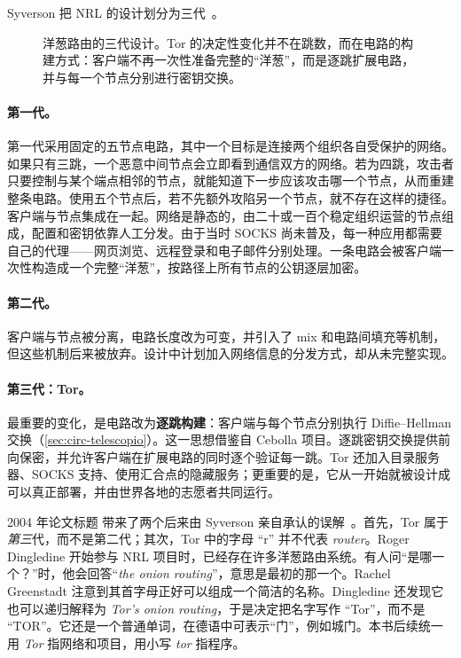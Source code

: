 Syverson 把 NRL 的设计划分为三代~\cite{syverson2011peel}。

\begin{figure}[htbp]
\centering

\caption{洋葱路由的三代设计。Tor 的决定性变化并不在跳数，而在电路的构建方式：客户端不再一次性准备完整的“洋葱”，而是逐跳扩展电路，并与每一个节点分别进行密钥交换。}
\label{fig:generazioni}
\end{figure}

\paragraph{第一代。} 第一代采用固定的五节点电路，其中一个目标是连接两个组织各自受保护的网络。如果只有三跳，一个恶意中间节点会立即看到通信双方的网络。若为四跳，攻击者只要控制与某个端点相邻的节点，就能知道下一步应该攻击哪一个节点，从而重建整条电路。使用五个节点后，若不先额外攻陷另一个节点，就不存在这样的捷径。客户端与节点集成在一起。网络是静态的，由二十或一百个稳定组织运营的节点组成，配置和密钥依靠人工分发。由于当时 SOCKS 尚未普及，每一种应用都需要自己的代理——网页浏览、远程登录和电子邮件分别处理。一条电路会被客户端一次性构造成一个完整“洋葱”，按路径上所有节点的公钥逐层加密。

\paragraph{第二代。} 客户端与节点被分离，电路长度改为可变，并引入了 mix 和电路间填充等机制，但这些机制后来被放弃。设计中计划加入网络信息的分发方式，却从未完整实现。

\paragraph{第三代：Tor。} 最重要的变化，是电路改为\textbf{逐跳构建}：客户端与每个节点分别执行 Diffie--Hellman 交换（\cref{sec:circ-telescopio}）。这一思想借鉴自 Cebolla 项目。逐跳密钥交换提供前向保密，并允许客户端在扩展电路的同时逐个验证每一跳。Tor 还加入目录服务器、SOCKS 支持、使用汇合点的隐藏服务；更重要的是，它从一开始就被设计成可以真正部署，并由世界各地的志愿者共同运行。

\begin{storia}[名称的由来]
2004 年论文标题  带来了两个后来由 Syverson 亲自承认的误解~\cite{syverson2011peel}。首先，Tor 属于\emph{第三}代，而不是第二代；其次，Tor 中的字母 \enquote{r} 并不代表 \emph{router}。Roger Dingledine 开始参与 NRL 项目时，已经存在许多洋葱路由系统。有人问\enquote{是哪一个？}时，他会回答\enquote{\emph{the onion routing}}，意思是最初的那一个。Rachel Greenstadt 注意到其首字母正好可以组成一个简洁的名称。Dingledine 还发现它也可以递归解释为 \emph{Tor's onion routing}，于是决定把名字写作 \enquote{Tor}，而不是 \enquote{TOR}。它还是一个普通单词，在德语中可表示“门”，例如城门。本书后续统一用 \emph{Tor} 指网络和项目，用小写 \emph{tor} 指程序。
\end{storia}

